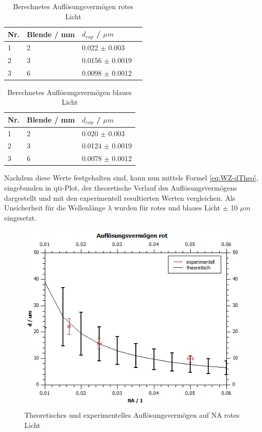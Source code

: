 \documentclass[12pt,a4paper,twoside]{article}
\begin{document}
\begin{table}[H]
    \centering
    \caption{Berechnetes Auflösungsvermögen rotes Licht}
    \label{tab:BerechneteAVrot}
    \begin{tabular}{| l | l | l | l |}
        \hline
        Nr. & Blende / mm & $d_{exp}$ / $\mu m$\\
        \hline
        1 & 2 & 0.022  $\pm$ 0.003  \\
        2 & 3 & 0.0156 $\pm$ 0.0019 \\
        3 & 6 & 0.0098 $\pm$ 0.0012 \\
        \hline
    \end{tabular}
\end{table}

\begin{table}[H]
    \centering
    \caption{Berechnetes Auflösungsvermögen blaues Licht}
    \label{tab:BerechneteAVblau}
    \begin{tabular}{| l | l | l |}
        \hline
        Nr. & Blende / mm & $d_{exp}$ / $\mu m$\\
        \hline
        1 & 2 & 0.020  $\pm$ 0.003  \\
        2 & 3 & 0.0124 $\pm$ 0.0019 \\
        3 & 6 & 0.0078 $\pm$ 0.0012 \\
        \hline
    \end{tabular}
\end{table}

\noindent
Nachdem diese Werte festgehalten sind, kann nun mittels Formel \ref{eq:WZ-dTheo}, eingebunden in qti-Plot, der theoretische Verlauf des Auflösungsvermögens dargestellt und mit den experimentell resultierten Werten vergleichen.
Als Unsicherheit für die Wellenlänge $ \lambda $ wurden für rotes und blaues Licht $\pm$ 10 $\mu m$ eingesetzt.

\begin{figure}[H]
    \centering
    \includegraphics[width=0.6\linewidth]{nudes/AuflösungsvermögenPlotRot.jpg}
    \caption{Theoretisches und experimentelles Auflösungsvermögen auf NA rotes Licht}
    \label{fig:AuflösungsvermögenPlotRot}
\end{figure}
\end{document}

